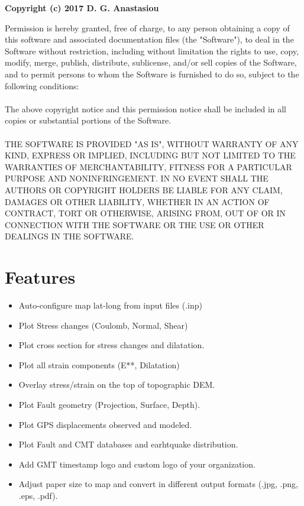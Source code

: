 \textbf{Copyright (c) 2017 D. G. Anastasiou}


Permission is hereby granted, free of charge, to any person obtaining a copy
of this software and associated documentation files (the "Software"), to deal
in the Software without restriction, including without limitation the rights
to use, copy, modify, merge, publish, distribute, sublicense, and/or sell
copies of the Software, and to permit persons to whom the Software is
furnished to do so, subject to the following conditions:
\\ \\
The above copyright notice and this permission notice shall be included in all
copies or substantial portions of the Software.
\\ \\
THE SOFTWARE IS PROVIDED "AS IS", WITHOUT WARRANTY OF ANY KIND, EXPRESS OR
IMPLIED, INCLUDING BUT NOT LIMITED TO THE WARRANTIES OF MERCHANTABILITY,
FITNESS FOR A PARTICULAR PURPOSE AND NONINFRINGEMENT. IN NO EVENT SHALL THE
AUTHORS OR COPYRIGHT HOLDERS BE LIABLE FOR ANY CLAIM, DAMAGES OR OTHER
LIABILITY, WHETHER IN AN ACTION OF CONTRACT, TORT OR OTHERWISE, ARISING FROM,
OUT OF OR IN CONNECTION WITH THE SOFTWARE OR THE USE OR OTHER DEALINGS IN THE
SOFTWARE.

\section{Features}\label{features}

\begin{itemize}
\item Auto-configure map lat-long from input files (.inp)
\item
  Plot Stress changes (Coulomb, Normal, Shear)
\item
  Plot cross section for stress changes and dilatation.
\item
  Plot all strain components (E**, Dilatation)
\item
  Overlay stress/strain on the top of topographic DEM.
\item
  Plot Fault geometry (Projection, Surface, Depth).
\item
  Plot GPS displacements observed and modeled.
\item
  Plot Fault and CMT databases and earhtquake distribution.
\item
  Add GMT timestamp logo and custom logo of your organization.
\item
  Adjust paper size to map and convert in different output formats
  (.jpg, .png, .eps, .pdf).
\end{itemize}

